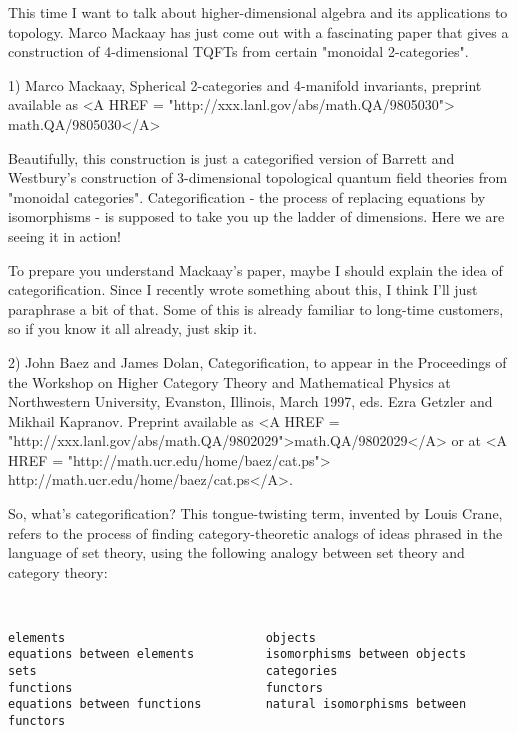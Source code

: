 

This time I want to talk about higher-dimensional algebra and its
applications to topology.  Marco Mackaay has just come out with a
fascinating paper that gives a construction of 4-dimensional TQFTs
from certain "monoidal 2-categories".  

1) Marco Mackaay, Spherical 2-categories and 4-manifold invariants,
preprint available as <A HREF = "http://xxx.lanl.gov/abs/math.QA/9805030">
math.QA/9805030</A>

Beautifully, this construction is just a categorified version of
Barrett and Westbury's construction of 3-dimensional topological
quantum field theories from "monoidal categories".
Categorification - the process of replacing equations by
isomorphisms - is supposed to take you up the ladder of dimensions.
Here we are seeing it in action!

To prepare you understand Mackaay's paper, maybe I should explain the
idea of categorification.  Since I recently wrote something about
this, I think I'll just paraphrase a bit of that.  Some of this is
already familiar to long-time customers, so if you know it all
already, just skip it.

2) John Baez and James Dolan, Categorification, to appear in the
Proceedings of the Workshop on Higher Category Theory and Mathematical
Physics at Northwestern University, Evanston, Illinois, March 1997,
eds. Ezra Getzler and Mikhail Kapranov.  Preprint available as
<A HREF = "http://xxx.lanl.gov/abs/math.QA/9802029">math.QA/9802029</A>
or at <A HREF = "http://math.ucr.edu/home/baez/cat.ps">
http://math.ucr.edu/home/baez/cat.ps</A>.

So, what's categorification?  This tongue-twisting term, invented by
Louis Crane, refers to the process of finding category-theoretic
analogs of ideas phrased in the language of set theory, using the
following analogy between set theory and category theory:


\begin{verbatim}


elements                            objects                       
equations between elements          isomorphisms between objects        
sets                                categories                    
functions                           functors                      
equations between functions         natural isomorphisms between functors  

\end{verbatim}
    
